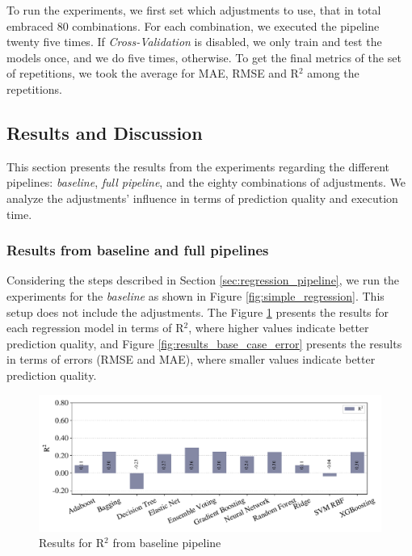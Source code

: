 To run the experiments, we first set which adjustments to use, that in total embraced 80 combinations. For each combination, we executed the pipeline twenty five times. If \emph{Cross-Validation} is disabled, we only train and test the models once, and we do five times, otherwise. To get the final metrics of the set of repetitions, we took the average for \gls{MAE}, \gls{RMSE} and R$^2$ among the repetitions.


\subsection{Results and Discussion}


This section presents the results from the experiments regarding the different pipelines: \textit{baseline}, \textit{full pipeline}, and the eighty combinations of adjustments. We analyze the adjustments' influence in terms of prediction quality and execution time.

\subsubsection{Results from baseline and full pipelines}

Considering the steps described in Section \ref{sec:regression_pipeline}, we run the experiments for the \textit{baseline} as shown in Figure \ref{fig:simple_regression}. This setup does not include the adjustments. The Figure \ref{fig:results_base_case_r2} presents the results for each regression model in terms of R$^2$, where higher values indicate better prediction quality, and Figure \ref{fig:results_base_case_error} presents the results in terms of errors (\gls{RMSE} and \gls{MAE}), where smaller values indicate better prediction quality.

\begin{figure}[!htb]
  \centering
  \caption{Results for R$^2$ from baseline pipeline}
  \label{fig:results_base_case_r2}
  \includegraphics[width=\textwidth]{images/chapters/results_regression_all_off_r2.pdf}
\end{figure}

